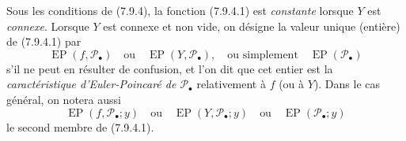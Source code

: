 \begin{env}[7.9.5]
\label{III.7.9.5.fr}
Sous les conditions de (7.9.4), la fonction (7.9.4.1) est \emph{constante}
lorsque $Y$ est \emph{connexe}. Lorsque $Y$ est connexe et non vide, on désigne
la valeur unique (entière) de (7.9.4.1) par
\[
  \operatorname{EP}(f,\mathscr P_\bullet)
  \quad\text{ou}\quad
  \operatorname{EP}(Y,\mathscr P_\bullet),
  \quad\text{ou simplement}\quad
  \operatorname{EP}(\mathscr P_\bullet)
\]
s'il ne peut en résulter de confusion, et l'on dit que cet entier est la
\emph{caractéristique d'Euler-Poincaré de $\mathscr P_\bullet$} relativement à
$f$ (ou à $Y$). Dans le cas général, on notera aussi
\[
  \operatorname{EP}(f,\mathscr P_\bullet;y)
  \quad\text{ou}\quad
  \operatorname{EP}(Y,\mathscr P_\bullet;y)
  \quad\text{ou}\quad
  \operatorname{EP}(\mathscr P_\bullet;y)
\]
le second membre de (7.9.4.1).
\end{env}

